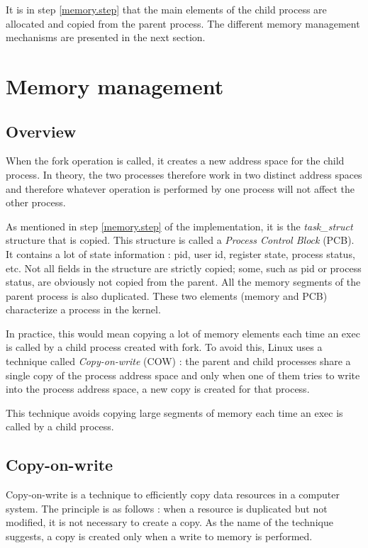 \documentclass[a4paper, 12pt]{article}
\begin{document}
    It is in step \ref{memory.step} that the main elements of the child process are allocated and copied from the parent process. The different memory management mechanisms are presented in the next section.
    
    
    \section{Memory management}
    
    \subsection{Overview}
    
    When the fork operation is called, it creates a new address space for the child process. In theory, the two processes therefore work in two distinct address spaces and therefore whatever operation is performed by one process will not affect the other process.
    
    As mentioned in step \ref{memory.step} of the implementation, it is the \emph{task\_struct} structure that is copied. This structure is called a \emph{Process Control Block} (PCB). It contains a lot of state information : pid, user id, register state, process status, etc. Not all fields in the structure are strictly copied; some, such as pid or process status, are obviously not copied from the parent. All the memory segments of the parent process is also duplicated. These two elements (memory and PCB) characterize a process in the kernel.
    
    In practice, this would mean copying a lot of memory elements each time an exec is called by a child process created with fork. To avoid this, Linux uses a technique called \emph{Copy-on-write} (COW) : the parent and child processes share a single copy of the process address space and only when one of them tries to write into the process address space, a new copy is created for that process.
    
    This technique avoids copying large segments of memory each time an exec is called by a child process.
    
    \subsection{Copy-on-write}
    
    Copy-on-write is a technique to efficiently copy data resources in a computer system. The principle is as follows : when a resource is duplicated but not modified, it is not necessary to create a copy. As the name of the technique suggests, a copy is created only when a write to memory is performed.
    
\end{document}
